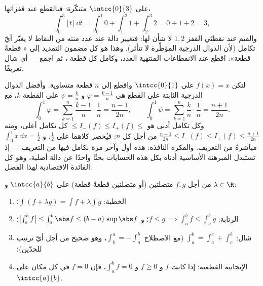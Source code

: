 \begin{example}\label{ex:b1:integration:piecewise}
 على $\intcc{0}{3}$ 
متنكّرة: فبالقطع عند قفزاتها،
\[
\int_0^3 \lfloor t \rfloor\,\dd t
= \int_0^1 0 + \int_1^2 1 + \int_2^3 2 = 0 + 1 + 2 = 3 ,
\]
والقيم \emph{عند} نقطتَي القفز $1, 2$ لا شأن لها:
فتغيير دالة عند عدد منته من النقاط لا يغيّر أيّ تكامل
(لأن الدوال الدرجية المؤطِّرة لا تتأثر). وهذا هو كل
مضمون التمديد إلى « قطعةً قطعة»: اقطع عند
الانقطاعات المنتهية العدد، وكامل كل قطعة ، ثم
اجمع --- أي شال تعريفًا.
\end{example}

\begin{example}\label{ex:b1:integration:defcompute}
لتكن $f(x) = x$ على $\intcc{0}{1}$ واقطع إلى $n$ قطعة متساوية.
وأفضل الدوال الدرجية الثابتة على القطع هي $\varphi =
\frac{k-1}{n}$ و $\psi = \frac kn$ على القطعة $k$، مع
\[
\int_0^1 \varphi = \sum_{k=1}^{n} \frac{k-1}{n}\cdot\frac1n
= \frac{n-1}{2n},
\qquad
\int_0^1 \psi = \sum_{k=1}^{n} \frac{k}{n}\cdot\frac1n
= \frac{n+1}{2n} .
\]
وكل تكامل أدنى هو $\leq I_-(f) \leq I_+(f) \leq$ كل
تكامل أعلى، ومنه $\frac{n-1}{2n} \leq I_-(f) \leq I_+(f) \leq
\frac{n+1}{2n}$ من أجل كل $n$: فيُحصر كلاهما على $\frac12$، و
$\int_0^1 x\,\dd x = \frac12$ مباشرةً من التعريف. والفكرة
النافذة: هذه أول وآخر مرة نكامل فيها
من التعريف --- إذ تستبدل المبرهنة الأساسية أدناه
بكل هذه الحسابات بحثًا واحدًا عن دالة أصلية، وهو
كل الفائدة الاقتصادية لهذا الفصل.
\end{example}

\begin{theorem}[الخصائص]\label{thm:b1:integration:props}
من أجل $f, g$ متصلتين (أو متصلتين قطعةً قطعة) على $\intcc{a}{b}$ و
$\lambda \in \R$:
\begin{enumerate}
  \item الخطية: $\int (f + \lambda g) = \int f + \lambda \int g$؛
  \item الرتابة: $f \leq g \implies \int_a^b f \leq \int_a^b g$؛
        و $\bigl|\int_a^b f\bigr| \leq \int_a^b \abs f \leq (b -
        a)\, \sup\abs f$؛
  \item شال: $\int_a^b = \int_a^c + \int_c^b$ (مع
        الاصطلاح $\int_b^a = -\int_a^b$، وهو صحيح من أجل أيّ ترتيب
        للحدّين)؛
  \item الإيجابية القطعية: إذا كانت $f$  و $f \geq 0$ و
        $\int_a^b f = 0$، فإن $f = 0$ في كل مكان على
        $\intcc{a}{b}$.
\end{enumerate}
\end{theorem}

